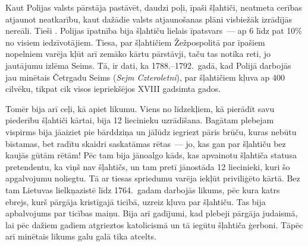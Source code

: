 \documentclass[twoside,a5paper,12pt,fleqn,openany]{extbook}
\newcommand{\pltxti}[1]{\textit{\textpolish{#1}}}
\begin{document}
Kaut Polijas valsts pārstāja pastāvēt, daudzi poļi, īpaši šļahtiči, neatmeta cerības atjaunot neatkarību, kaut dažādie valsts atjaunošanas plāni visbiežāk izrādījās nereāli. Tieši . Polijas īpatnība bija šļahtiču lielais īpatsvars~--- ap 6 līdz pat 10\% no visiem iedzīvotājiem. Tiesa, par šļahtičiem Žežpospolitā par īpašiem nopelniem varēja kļūt arī zemāko kārtu pārstāvji, taču tas notika reti, jo jautājumu izlēma Seims. Tā, ir dati, ka 1788.--1792.~gadā, kad Polijā darbojās jau minētais Četrgadu Seims (\pltxti{Sejm Czteroletni}), par šļahtičiem kļuva ap 400 cilvēku, tikpat cik visos iepriekšējos XVIII gadsimta gados.

Tomēr bija arī ceļi, kā apiet likumu. Viens no līdzekļiem, kā pierādīt savu piederību šļahtiči kārtai, bija 12 liecinieku uzrādīšana. Bagātam plebejam vispirms bija jāaiziet pie bārddziņa un jālūdz iegriezt pāris brūču, kuras nebūtu bīstamas, bet radītu skaidri saskatāmas rētas~--- jo, kas gan par šļahtiču bez kaujās gūtām rētām! Pēc tam bija jānoalgo kāds, kas apvainotu šļahtiča statusa pretendentu, ka viņš nav šļahtičs, un tam pretī jānostāda 12 liecinieki, kuri šo apgalvojumu noliegtu. Tā ar tiesas spriedumu varēja iekļūt priviliģēto kārtā. Bez tam Lietuvas lielkņazistē līdz 1764.~gadam darbojās likums, pēc kura katrs ebrejs, kurš pārgāja kristīgajā ticībā, uzreiz kļuva par šļahtiču. Tas bija apbalvojums par ticības maiņu. Bija arī gadījumi, kad plebeji pārgāja judaismā, lai pēc dažiem gadiem atgrieztos katolicismā un tā iegūtu šļahtiča ģerboni. Tāpēc arī minētais likums galu galā tika atcelts.
\end{document}
